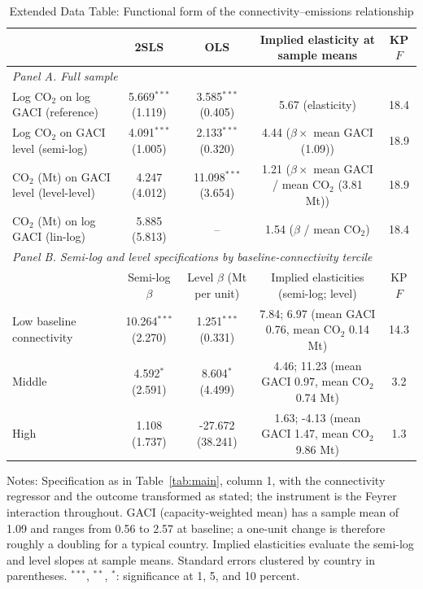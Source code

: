 \begin{table}[htbp]
\centering
\begin{threeparttable}
\caption{Extended Data Table: Functional form of the connectivity--emissions relationship}
\label{tab:funcform}
\footnotesize
\begin{tabular}{lcccc}
\toprule
 & 2SLS & OLS & Implied elasticity at sample means & KP $F$ \\
\midrule
\multicolumn{5}{l}{\textit{Panel A. Full sample}} \\
  Log CO$_2$ on log GACI (reference) & 5.669$^{***}$ (1.119) & 3.585$^{***}$ (0.405) & 5.67 (elasticity) & 18.4 \\
  Log CO$_2$ on GACI level (semi-log) & 4.091$^{***}$ (1.005) & 2.133$^{***}$ (0.320) & 4.44 ($\beta \times$ mean GACI (1.09)) & 18.9 \\
  CO$_2$ (Mt) on GACI level (level-level) & 4.247 (4.012) & 11.098$^{***}$ (3.654) & 1.21 ($\beta \times$ mean GACI / mean CO$_2$ (3.81 Mt)) & 18.9 \\
  CO$_2$ (Mt) on log GACI (lin-log) & 5.885 (5.813) & -- & 1.54 ($\beta$ / mean CO$_2$) & 18.4 \\
\midrule
\multicolumn{5}{l}{\textit{Panel B. Semi-log and level specifications by baseline-connectivity tercile}} \\
 & Semi-log $\beta$ & Level $\beta$ (Mt per unit) & Implied elasticities (semi-log; level) & KP $F$ \\
  Low baseline connectivity & 10.264$^{***}$ (2.270) & 1.251$^{***}$ (0.331) & 7.84; 6.97 (mean GACI 0.76, mean CO$_2$ 0.14 Mt) & 14.3 \\
  Middle & 4.592$^{*}$ (2.591) & 8.604$^{*}$ (4.499) & 4.46; 11.23 (mean GACI 0.97, mean CO$_2$ 0.74 Mt) & 3.2 \\
  High & 1.108 (1.737) & -27.672 (38.241) & 1.63; -4.13 (mean GACI 1.47, mean CO$_2$ 9.86 Mt) & 1.3 \\
\bottomrule
\end{tabular}
\begin{tablenotes}[flushleft]
\footnotesize
\item Notes: Specification as in Table~\ref{tab:main}, column 1, with the connectivity regressor and the outcome transformed as stated; the instrument is the Feyrer interaction throughout. GACI (capacity-weighted mean) has a sample mean of 1.09 and ranges from 0.56 to 2.57 at baseline; a one-unit change is therefore roughly a doubling for a typical country. Implied elasticities evaluate the semi-log and level slopes at sample means. Standard errors clustered by country in parentheses. $^{***}$, $^{**}$, $^{*}$: significance at 1, 5, and 10 percent.
\end{tablenotes}
\end{threeparttable}
\end{table}


